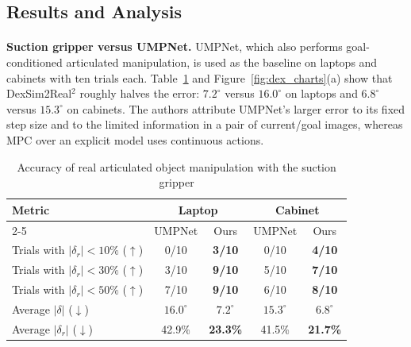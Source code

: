 \documentclass[12pt,a4paper,final]{extreport}
\begin{document}
\subsection{Results and Analysis}

\paragraph{} \textbf{Suction gripper versus UMPNet.} UMPNet, which also performs goal-conditioned articulated manipulation, is used as the baseline on laptops and cabinets with ten trials each. Table~\ref{tab:dex_suction} and Figure~\ref{fig:dex_charts}(a) show that DexSim2Real$^2$ roughly halves the error: $7.2^{\circ}$ versus $16.0^{\circ}$ on laptops and $6.8^{\circ}$ versus $15.3^{\circ}$ on cabinets. The authors attribute UMPNet's larger error to its fixed step size and to the limited information in a pair of current/goal images, whereas MPC over an explicit model uses continuous actions.

{\renewcommand{\arraystretch}{1.2}
\begin{table}[htbp]
\centering
\caption{Accuracy of real articulated object manipulation with the suction gripper \cite{p1}}\label{tab:dex_suction}
\small
\begin{tabular}{|l|c|c|c|c|}
\hline
\multirow{2}{*}{\textbf{Metric}} & \multicolumn{2}{c|}{\textbf{Laptop}} & \multicolumn{2}{c|}{\textbf{Cabinet}} \\ \cline{2-5}
 & UMPNet & Ours & UMPNet & Ours \\ \hline
Trials with $|\delta_r|<10\%$ ($\uparrow$) & 0/10 & \textbf{3/10} & 0/10 & \textbf{4/10} \\ \hline
Trials with $|\delta_r|<30\%$ ($\uparrow$) & 3/10 & \textbf{9/10} & 5/10 & \textbf{7/10} \\ \hline
Trials with $|\delta_r|<50\%$ ($\uparrow$) & 7/10 & \textbf{9/10} & 6/10 & \textbf{8/10} \\ \hline
Average $|\delta|$ ($\downarrow$) & $16.0^{\circ}$ & $\mathbf{7.2^{\circ}}$ & $15.3^{\circ}$ & $\mathbf{6.8^{\circ}}$ \\ \hline
Average $|\delta_r|$ ($\downarrow$) & 42.9\% & \textbf{23.3\%} & 41.5\% & \textbf{21.7\%} \\ \hline
\end{tabular}
\end{table}}
\end{document}
